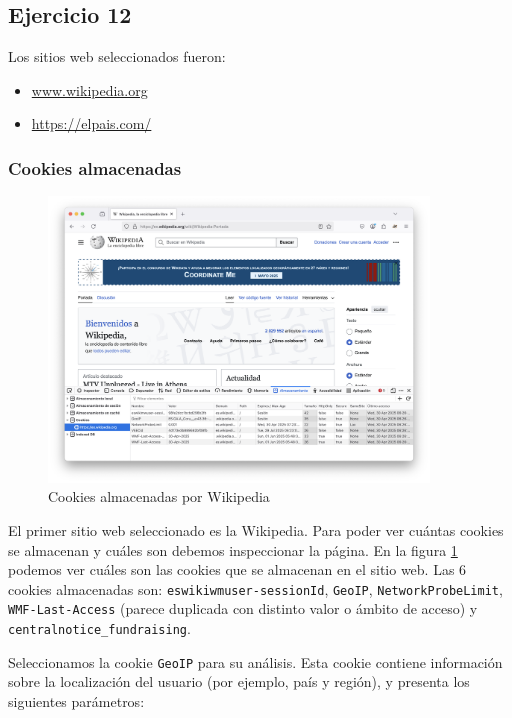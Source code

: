 \subsection{Ejercicio 12}
\graphicspath{ {img/12} }

Los sitios web seleccionados fueron:
\begin{itemize}
    \item \url{www.wikipedia.org}
    \item \url{https://elpais.com/}
\end{itemize}

\subsubsection{Cookies almacenadas}

\begin{figure}[H]
    \centering
    \includegraphics[width=0.9\textwidth]{cookies_wiki.png}
    \caption{Cookies almacenadas por Wikipedia}
    \label{fig:cookies_wiki}
\end{figure}

El primer sitio web seleccionado es la Wikipedia. Para poder ver cuántas cookies se almacenan y cuáles son debemos inspeccionar la página. En la figura \ref{fig:cookies_wiki} podemos ver cuáles son las cookies que se almacenan en el sitio web. Las 6 cookies almacenadas son: \texttt{eswikiwmuser-sessionId}, \texttt{GeoIP}, \texttt{NetworkProbeLimit}, \texttt{WMF-Last-Access} (parece duplicada con distinto valor o ámbito de acceso) y \texttt{centralnotice\_fundraising}.

Seleccionamos la cookie \texttt{GeoIP} para su análisis. Esta cookie contiene información sobre la localización del usuario (por ejemplo, país y región), y presenta los siguientes parámetros:

